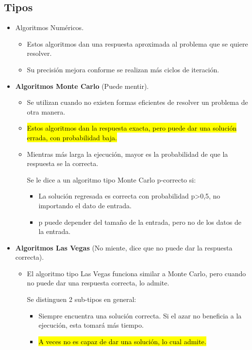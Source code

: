 \documentclass{templateNote}
\begin{document}
\subsection*{Tipos}
\begin{itemize}
    \item Algoritmos Numéricos.
    \begin{itemize}
        \item Estos algoritmos dan una respuesta aproximada al problema que se quiere resolver.

        \item Su precisión mejora conforme se realizan más ciclos de iteración.
    \end{itemize}

    \item \textbf{Algoritmos Monte Carlo} (Puede mentir).
    \begin{itemize}
        \item Se utilizan cuando no existen formas eficientes de resolver un problema de otra manera.

        \item \hl{Estos algoritmos dan la respuesta exacta, pero puede dar una solución errada, con probabilidad baja.}

        \item Mientras más larga la ejecución, mayor es la probabilidad de que la respuesta se la correcta.
        
        Se le dice a un algoritmo tipo Monte Carlo p-correcto si:
        \begin{itemize}
            \item La solución regresada es correcta con probabilidad p>0,5, no importando el dato de entrada.
            \item p puede depender del tamaño de la entrada, pero no de los datos de la entrada.
        \end{itemize}

    \end{itemize}
    
    \item \textbf{Algoritmos Las Vegas} (No miente, dice que no puede dar la respuesta correcta).
    \begin{itemize}
        \item El algoritmo tipo Las Vegas funciona similar a Monte Carlo, pero cuando no puede dar una respuesta correcta, lo admite.
        
        Se distinguen 2 sub-tipos en general:
        \begin{itemize}
            \item Siempre encuentra una solución correcta. Si el azar no beneficia a la ejecución, esta tomará más tiempo.
            \item \hl{A veces no es capaz de dar una solución, lo cual admite.}
        \end{itemize}
    \end{itemize}
\end{itemize}
\end{document}
